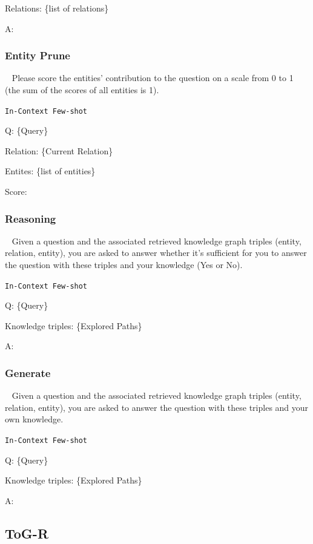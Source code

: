 \documentclass{article} %
\begin{document}
Relations: \{list of relations\} 

A: 

\subsubsection{Entity Prune}~\label{prompts4ent}
Please score the entities' contribution to the question on a scale from 0 to 1 (the sum of the scores of all entities is 1).

\texttt{In-Context Few-shot}

Q: \{Query\} 

Relation: \{Current Relation\} 

Entites:  \{list of entities\} 

Score:

\subsubsection{Reasoning}~\label{prompts4rea}
Given a question and the associated retrieved knowledge graph triples (entity, relation, entity), you are asked to answer whether it's sufficient for you to answer the question with these triples and your knowledge (Yes or No).

\texttt{In-Context Few-shot}

Q: \{Query\} 

Knowledge triples: \{Explored Paths\} 

A: 

\subsubsection{Generate}~\label{prompts4gen}
Given a question and the associated retrieved knowledge graph triples (entity, relation, entity), you are asked to answer the question with these triples and your own knowledge.

\texttt{In-Context Few-shot}

Q: \{Query\} 

Knowledge triples: \{Explored Paths\} 

A: 

\subsection{ToG-R}

\end{document}
